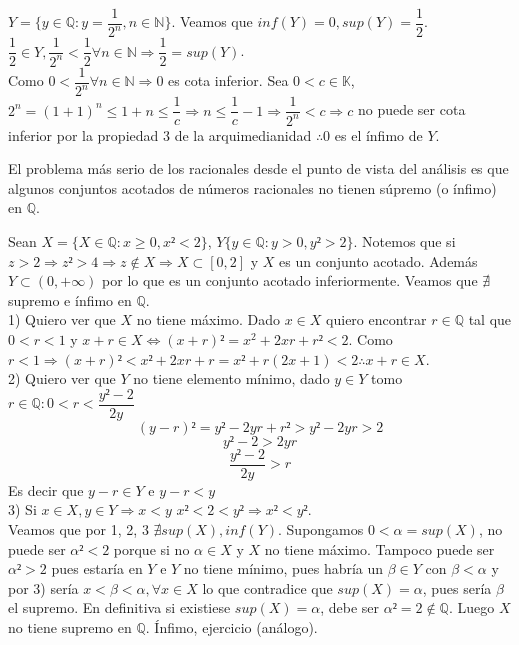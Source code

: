 \begin{eg}
    $Y = \{ y \in \mathbb{Q} : y=\dfrac{1}{2^n}, n\in \mathbb{N} \}$. Veamos que $inf(Y) =0, sup(Y) = \dfrac12$. \\
    $\dfrac{1}{2} \in Y, \dfrac{1}{2^n}<\dfrac{1}{2} \forall n \in \mathbb{N} \Rightarrow \dfrac{1}{2} = sup(Y)$. \\
    
    Como $0 < \dfrac{1}{2^n} \forall n \in \mathbb{N} \Rightarrow 0$ es cota inferior. Sea $0<c \in \mathbb{K}$, $2^n = (1+1)^n \leq 1+n \leq \dfrac{1}{c} \Rightarrow n \leq \dfrac{1}{c} -1 \Rightarrow \dfrac{1}{2^n} < c \Rightarrow c$ no puede ser cota inferior por la propiedad 3 de la arquimedianidad $\therefore 0$ es el ínfimo de $Y$. 
\end{eg}

El problema más serio de los racionales desde el punto de vista del análisis es que algunos conjuntos acotados de números racionales no tienen súpremo (o ínfimo) en $\mathbb{Q}$.

\begin{eg}
    Sean $X = \{ X \in \mathbb{Q} : x \geq 0, x² < 2 \}$,
    $Y \{ y \in \mathbb{Q} : y>0, y² > 2 \}$. Notemos que si $z>2 \Rightarrow z² > 4 \Rightarrow z \notin X \Rightarrow X \subset [0, 2]$ y $X$ es un conjunto acotado. Además $Y \subset (0, +\infty)$ por lo que es un conjunto acotado inferiormente. Veamos que $\nexists$ supremo e ínfimo en $\mathbb{Q}$. \\
    
    1) Quiero ver que $X$ no tiene máximo. Dado $x \in X$ quiero encontrar $r \in \mathbb{Q}$ tal que $0<r<1$ y $x+r \in X \iff (x+r)² =x^2+2xr+r² < 2$. Como $r<1 \Rightarrow (x+r)²<x²+2xr+r=x²+r(2x+1)<2 \therefore x+r \in X$. \\
    2) Quiero ver que $Y$ no tiene elemento mínimo, dado $y \in Y$ tomo $r \in \mathbb{Q} : 0 < r < \dfrac{y²-2}{2y}$
    \begin{equation}
        (y-r)²=y²-2yr+r²>y²-2yr>2
    \end{equation}
    \begin{equation}
        y²-2 > 2yr
    \end{equation}
    \begin{equation}
        \dfrac{y²-2}{2y}>r
    \end{equation}
    Es decir que $y-r \in Y$ e $y-r < y$ \\
    
    3) Si $x \in X, y \in Y \Rightarrow x < y$
    $x² < 2 < y² \Rightarrow x² < y²$. \\

    Veamos que por 1, 2, 3 $\nexists sup(X), inf(Y)$. Supongamos $0< \alpha = sup(X)$, no puede ser $\alpha²<2$ porque si no $\alpha \in X$ y $X$ no tiene máximo. Tampoco puede ser $\alpha² > 2$ pues estaría en $Y$ e $Y$ no tiene mínimo, pues habría un $\beta \in Y$ con $\beta < \alpha$ y por 3) sería $x < \beta < \alpha, \forall x \in X$ lo que contradice que $sup(X) = \alpha$, pues sería $\beta$ el supremo.
    En definitiva si existiese $sup(X) = \alpha$, debe ser $\alpha² = 2 \notin \mathbb{Q}$. Luego $X$ no tiene supremo en $\mathbb{Q}$.
    Ínfimo, ejercicio (análogo).
\end{eg}

